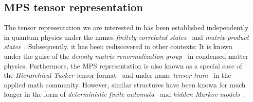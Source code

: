 


\subsection{MPS tensor representation}%
\label{sub:mps.tensor_representation}

The tensor representation we are interested in has been established independently in quantum physics under the names \emph{finitely correlated states}~\cite{Fannes_1992_Finitely} and \emph{matrix-product states}~\cite{Klumper_1991_Equivalence,Kluemper_1992_Groundstate}.
Subsequently, it has been rediscovered in other contexts:
It is known under the guise of the \emph{density matrix renormalization group}~\cite{White_1992_Density,Schollwoeck_2011_DensityMatrix} in condensed matter physics.
Furthermore, the MPS representation is also known as a special case of the \emph{Hierarchical Tucker} tensor format~\cite{Hackbusch_2012_Tensor,Grasedyck_2010_Hierarchical} and under name \emph{tensor-train}~\cite{Oseledets_2011_TensorTrain} in the applied math community.
However, similar structures have been known for much longer in the form of \emph{deterministic finite automata}~\cite{Hopcroft_2014_Introduction} and \emph{hidden Markov models}~\cite{Cappe_2006_Inference}.

